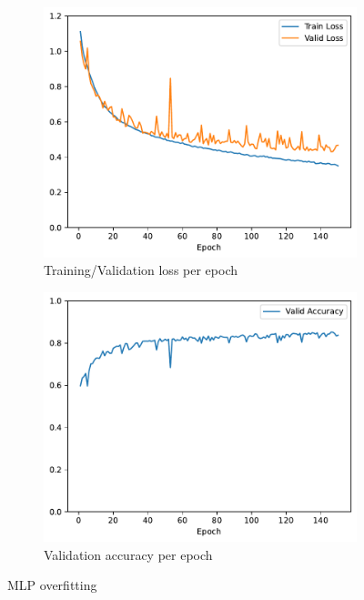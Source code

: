 \documentclass[11pt]{article}
\begin{document}
\begin{figure}[h!]
\centering
\begin{subfigure}{.5\textwidth}
  \centering
  \includegraphics[width=.9\linewidth]{plots/mlp-training-loss-batch-256-lr-0.1-epochs-150-hidden-200-dropout-0-l2-0-layers-1-act-relu-opt-sgd.pdf}
  \caption{Training/Validation loss per epoch}
\end{subfigure}%
\begin{subfigure}{.5\textwidth}
  \centering
  \includegraphics[width=.9\linewidth]{plots/mlp-validation-accuracy-batch-256-lr-0.1-epochs-150-hidden-200-dropout-0-l2-0-layers-1-act-relu-opt-sgd}
  \caption{Validation accuracy per epoch}
\end{subfigure}
\caption{MLP overfitting}
\label{fig:MLP_overfitting}
\end{figure}
\end{document}

